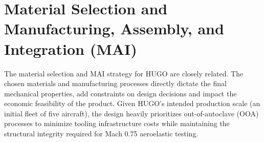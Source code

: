 \section*{Material Selection and Manufacturing, Assembly, and Integration (MAI)}
\label{sec:mai_plan}

The material selection and MAI strategy for HUGO are closely related. The chosen materials and manufacturing processes directly dictate the final mechanical properties, add constraints on design decisions and impact the economic feasibility of the product. Given HUGO's intended production scale (an initial fleet of five aircraft), the design heavily prioritizes out-of-autoclave (OOA) processes to minimize tooling infrastructure costs while maintaining the structural integrity required for Mach 0.75 aeroelastic testing.

